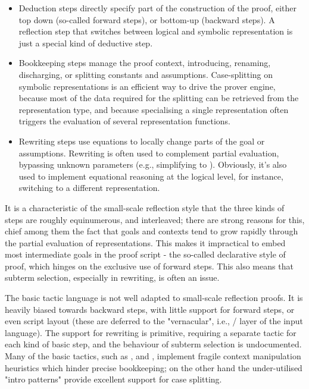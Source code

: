 \begin{itemize}
\item Deduction steps directly specify part of the construction of
the proof, either top down (so-called forward steps), or bottom-up
(backward steps). A reflection step that switches between logical and
symbolic representation is just a special kind of deductive step.  
\item
Bookkeeping steps manage the proof context, introducing, renaming,
discharging, or splitting constants and assumptions. Case-splitting on
symbolic representations is an efficient way to drive the prover
engine, because most of the data required for the splitting can be
retrieved from the representation type, and because specialising a
single representation often triggers the evaluation of several
representation functions.  
\item Rewriting steps use equations to locally
change parts of the goal or assumptions.  Rewriting is often used to
complement partial evaluation, bypassing unknown parameters (e.g.,
simplifying  to ). Obviously, it's also used to
implement equational reasoning at the logical level, for instance,
switching to a different representation.  
\end{itemize}

It is a characteristic of the
small-scale reflection style that the three kinds of steps are roughly
equinumerous, and interleaved; there are strong reasons for this,
chief among them the fact that goals and contexts tend to grow rapidly
through the partial evaluation of representations.  This makes it
impractical to embed most intermediate goals in the proof script - the
so-called declarative style of proof, which hinges on the exclusive
use of forward steps. This also means that subterm selection,
especially in rewriting, is often an issue.

The basic \Coq{} tactic language is not well adapted to small-scale
reflection proofs. It is heavily biased towards backward steps, with
little support for forward steps, or even script layout (these are
deferred to the "vernacular", i.e., / layer of
the input language). The support for rewriting is primitive, requiring
a separate tactic for each kind of basic step, and the behaviour of
subterm selection is undocumented. Many of the basic tactics, such as
,  and , implement fragile context
manipulation heuristics which hinder precise bookkeeping; on the other
hand the under-utilised "intro patterns" provide excellent support for
case splitting.

